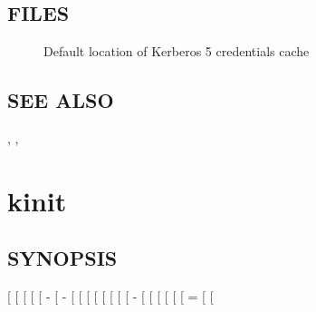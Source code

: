 \documentclass[letterpaper,10pt,english]{sphinxmanual}
\begin{document}
\subsection{FILES}
\label{\detokenize{user/user_commands/kdestroy:files}}\begin{description}
\item[{}] \leavevmode
Default location of Kerberos 5 credentials cache

\end{description}


\subsection{SEE ALSO}
\label{\detokenize{user/user_commands/kdestroy:see-also}}
{\hyperref[\detokenize{user/user_commands/kinit:kinit-1}]{}}, {\hyperref[\detokenize{user/user_commands/klist:klist-1}]{}}, {\hyperref[\detokenize{user/user_config/kerberos:kerberos-7}]{}}


\section{kinit}
\label{\detokenize{user/user_commands/kinit:kinit-1}}\label{\detokenize{user/user_commands/kinit:kinit}}\label{\detokenize{user/user_commands/kinit::doc}}

\subsection{SYNOPSIS}
\label{\detokenize{user/user_commands/kinit:synopsis}}
{[}\sphinxstylestrong{-V}{]}
{[} \sphinxstyleemphasis{lifetime}{]}
{[} \sphinxstyleemphasis{start\_time}{]}
{[} \sphinxstyleemphasis{renewable\_life}{]}
{[} \textbar{} -\sphinxstylestrong{P}{]}
{[} \textbar{} -\sphinxstylestrong{F}{]}
{[}\sphinxstylestrong{-a}{]}
{[}\sphinxstylestrong{-A}{]}
{[}\sphinxstylestrong{-C}{]}
{[}\sphinxstylestrong{-E}{]}
{[}\sphinxstylestrong{-v}{]}
{[}\sphinxstylestrong{-R}{]}
{[} {[} \textbar{} - \sphinxstyleemphasis{keytab\_file}{]}{]}
{[} \sphinxstyleemphasis{cache\_name}{]}
{[}\sphinxstylestrong{-n}{]}
{[} \sphinxstyleemphasis{service\_name}{]}
{[} \sphinxstyleemphasis{input\_ccache}{]}
{[} \sphinxstyleemphasis{armor\_ccache}{]}
{[} \sphinxstyleemphasis{attribute}{[}=\sphinxstyleemphasis{value}{]}{]}
{[} \textbar{} \sphinxstylestrong{\textendash{}no-request-pac}{]}
{[}\sphinxstyleemphasis{principal}{]}
\end{document}
